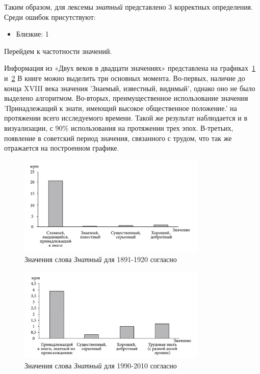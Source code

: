 Таким образом, для лексемы \textit{знатный} представлено 3 корректных определения.
Среди ошибок присутствуют:
\begin{itemize}
    \item Близкие: 1
\end{itemize}

Перейдем к частотности значений.

Информация из «Двух веков в двадцати значениях» представлена на графиках~\ref{fig:TwoCentruriesZnatniy1} и~\ref{fig:TwoCentruriesZnatniy2}
В книге можно выделить три основных момента.
Во-первых, наличие до конца XVIII века значения ’Знаемый, известный, видимый’,
однако оно не было выделено алгоритмом.
Во-вторых, преимущественное использование значения
’Принадлежащий к знати, имеющий высокое общественное положение.’ на протяжении
всего исследуемого времени.
Такой же результат наблюдается и в визуализации, с 90\% использования на протяжении трех эпох.
В-третьих, появление в советский период значения, связанного с трудом,
что так же отражается на построенном графике.

\noindent %
\begin{figure}[H]
    \centering %
    \includegraphics[width=0.8\textwidth]{img/book/znatnij/1891-1920}
    \caption{Значения слова \textit{Знатный} для 1891-1920 согласно~\cite{TwoCenturies}}
    \label{fig:TwoCentruriesZnatniy1}
\end{figure}


\begin{figure}[H]
    \centering %
    \includegraphics[width=0.8\textwidth]{img/book/znatnij/1990-2010}
    \caption{Значения слова \textit{Знатный} для 1990-2010 согласно~\cite{TwoCenturies}}
    \label{fig:TwoCentruriesZnatniy2}
\end{figure}

